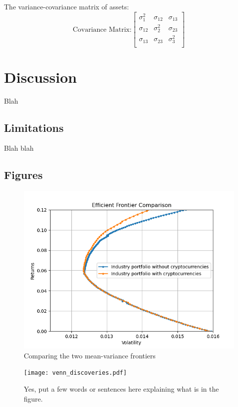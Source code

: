 \documentclass[12pt,a4paper]{article}
\begin{document}
\noindent The variance-covariance matrix of assets: 
\[
\text{Covariance Matrix:}
\begin{bmatrix}
    \sigma_{1}^2 & \sigma_{12} & \sigma_{13} \\
    \sigma_{12} & \sigma_{2}^2 & \sigma_{23} \\
    \sigma_{13} & \sigma_{23} & \sigma_{3}^2 \\
\end{bmatrix}
\]

\section{Discussion}\label{sec:discussion}

Blah

\subsection{Limitations}\label{sec:limitations}

Blah blah

\subsection{Figures}\label{sec:future}

\begin{figure}
    \centering
    \includegraphics[width=1\linewidth]{figures/figure1.png}
    \caption{Comparing the two mean-variance frontiers}
    \label{fig:enter-label}
\end{figure}


\begin{figure}[htbp!]
\begin{center}
\texttt{[image: venn\_discoveries.pdf]}
\end{center}
\caption{Yes, put a few words or sentences here explaining what is in the figure.}
\label{fig:venn}
\end{figure}



\end{document}
